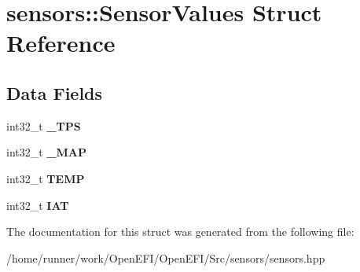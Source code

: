 \hypertarget{structsensors_1_1SensorValues}{}\section{sensors\+:\+:Sensor\+Values Struct Reference}
\label{structsensors_1_1SensorValues}
\subsection*{Data Fields}
\begin{DoxyCompactItemize}
\item 
\mbox{\label{structsensors_1_1SensorValues_ad703c7668dbb6f22511e5105b66ce4e9}} 
int32\+\_\+t {\bfseries \+\_\+\+T\+PS}
\item 
\mbox{\label{structsensors_1_1SensorValues_aa6f5597bd720cd46d9fa61a0b3740301}} 
int32\+\_\+t {\bfseries \+\_\+\+M\+AP}
\item 
\mbox{\label{structsensors_1_1SensorValues_a49dca08974dfea5b6cc2e1ea873f76df}} 
int32\+\_\+t {\bfseries T\+E\+MP}
\item 
\mbox{\label{structsensors_1_1SensorValues_a3c7eebe30720d9989a4e3f987b632308}} 
int32\+\_\+t {\bfseries I\+AT}
\end{DoxyCompactItemize}


The documentation for this struct was generated from the following file\+:\begin{DoxyCompactItemize}
\item 
/home/runner/work/\+Open\+E\+F\+I/\+Open\+E\+F\+I/\+Src/sensors/sensors.\+hpp\end{DoxyCompactItemize}
